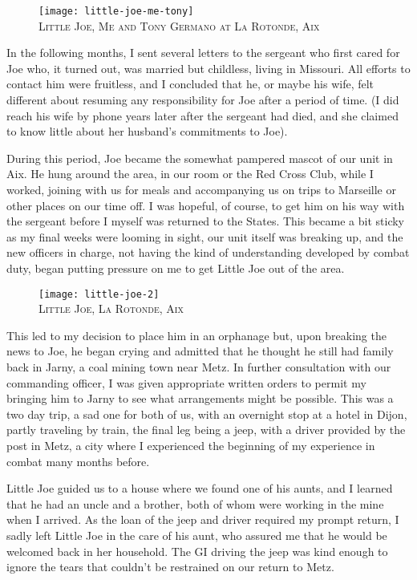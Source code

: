 \documentclass[../m3y]{subfiles}
\begin{document}
\begin{figure}[h]
\centering
\texttt{[image: little-joe-me-tony]}\\
\medskip
{\newtimes\textsc{Little Joe, Me and Tony Germano at La Rotonde, Aix}}
\end{figure}

In the following months, I sent several letters to the sergeant who first cared for Joe who, it turned out, was married but childless, living in Missouri. All efforts to contact him were fruitless, and I concluded that he, or maybe his wife, felt different about resuming any responsibility for Joe after a period of time. (I did reach his wife by phone years later after the sergeant had died, and she claimed to know little about her husband's commitments to Joe).

During this period, Joe became the somewhat pampered mascot of our unit in Aix. He hung around the area, in our room or the Red Cross Club, while I worked, joining with us for meals and accompanying us on trips to Marseille or other places on our time off. I was hopeful, of course, to get him on his way with the sergeant before I myself was returned to the States. This became a bit sticky as my final weeks were looming in sight, our unit itself was breaking up, and the new officers in charge, not having the kind of understanding developed by combat duty, began putting pressure on me to get Little Joe out of the area.


\begin{figure}[h]
\centering
\texttt{[image: little-joe-2]}\\
\medskip
{\newtimes\textsc{Little Joe, La Rotonde, Aix}}
\end{figure}
This led to my decision to place him in an orphanage but, upon breaking the news to Joe, he began crying and admitted that he thought he still had family back in Jarny, a coal mining town near Metz. In further consultation with our commanding officer, I was given appropriate written orders to permit my bringing him to Jarny to see what arrangements might be possible. This was a two day trip, a sad one for both of us, with an overnight stop at a hotel in Dijon, partly traveling by train, the final leg being a jeep, with a driver provided by the post in Metz, a city where I experienced the beginning of my experience in combat many months before.

Little Joe guided us to a house where we found one of his aunts, and I learned that he had an uncle and a brother, both of whom were working in the mine when I arrived. As the loan of the jeep and driver required my prompt return, I sadly left Little Joe in the care of his aunt, who assured me that he would be welcomed back in her household. The GI driving the jeep was kind enough to ignore the tears that couldn't be restrained on our return to Metz.
\end{document}
